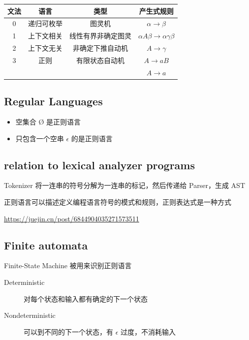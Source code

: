 \documentclass[11pt,journal,compsoc]{IEEEtran}
\begin{document}
\begin{table}[h]
\centering
\begin{tabular}{|c|c|c|c|}
\hline
文法 & 语言 & 类型 & 产生式规则 \\
\hline
0 & 递归可枚举 & 图灵机 & $\alpha \rightarrow \beta$ \\
\hline
1 & 上下文相关 & 线性有界非确定图灵 & $\alpha A \beta \rightarrow \alpha \gamma \beta$ \\
\hline
2 & 上下文无关 & 非确定下推自动机 & $A \rightarrow \gamma$ \\
\hline
3 & 正则 & 有限状态自动机 & $A \rightarrow aB$ \\
& & & $A \rightarrow a$ \\
\hline
\end{tabular}
\end{table}


\subsection{Regular Languages}

\begin{itemize}
    \item 空集合 Ø 是正则语言
    \item 只包含一个空串 $\epsilon$ 的是正则语言
\end{itemize}


\subsection{relation to lexical analyzer programs}

Tokenizer 将一连串的符号分解为一连串的标记，然后传递给 Parser，生成 AST

正则语言可以描述定义编程语言符号的模式和规则，正则表达式是一种方式

\url{https://juejin.cn/post/6844904035271573511}


\subsection{Finite automata}

Finite-State Machine 被用来识别正则语言

\begin{description}
    \item[Deterministic] 对每个状态和输入都有确定的下一个状态

    \item[Nondeterministic] 可以到不同的下一个状态，有 $\epsilon$ 过度，不消耗输入
\end{description}
\end{document}
